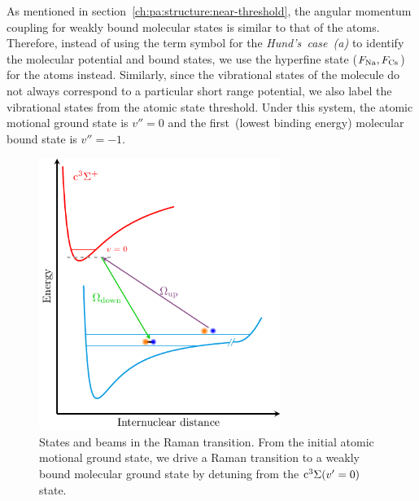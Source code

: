 As mentioned in section~\ref{ch:pa:structure:near-threshold},
the angular momentum coupling for weakly bound molecular states is similar to that of the atoms.
Therefore, instead of using the term symbol for the \textit{Hund's~case~(a)}
to identify the molecular potential and bound states,
we use the hyperfine state ($F_{\mathrm{Na}}, F_{\mathrm{Cs}}$) for the atoms instead.
Similarly, since the vibrational states of the molecule do not always correspond to
a particular short range potential, we also label the vibrational states
from the atomic state threshold.
Under this system, the atomic motional ground state is $v''=0$ and
the first~(lowest binding energy) molecular bound state is $v''=-1$.

\begin{figure}
  \centering
  \includegraphics[width=0.7\textwidth]{figures/raman_spectroscopy_scheme.pdf}
  \caption[Raman transition energy diagram]{
    States and beams in the Raman transition.
    From the initial atomic motional ground state,
    we drive a Raman transition to a weakly bound molecular ground state
    by detuning from the $\mathrm{c^3\Sigma}{\left({v'=0}\right)}$ state.
    \label{fig:raman-spectroscopy:scheme}}
\end{figure}

